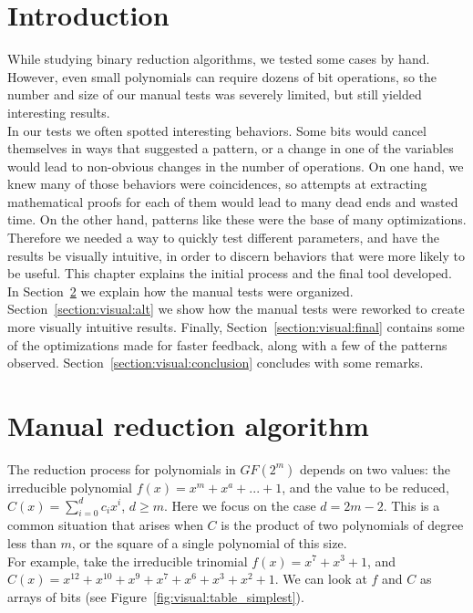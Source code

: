 \section{Introduction}

While studying binary reduction algorithms, we tested some cases by hand. However, even small polynomials can require dozens of bit operations, so the number and size of our manual tests was severely limited, but still yielded interesting results. \\

In our tests we often spotted interesting behaviors. Some bits would cancel themselves in ways that suggested a pattern, or a change in one of the variables would lead to non-obvious changes in the number of operations. On one hand, we knew many of those behaviors were coincidences, so attempts at extracting mathematical proofs for each of them would lead to many dead ends and wasted time. On the other hand, patterns like these were the base of many optimizations. \\

Therefore we needed a way to quickly test different parameters, and have the results be visually intuitive, in order to discern behaviors that were more likely to be useful. This chapter explains the initial process and the final tool developed. In Section~\ref{section:visual:manual} we explain how the manual tests were organized. Section~\ref{section:visual:alt} we show how the manual tests were reworked to create more visually intuitive results. Finally, Section~\ref{section:visual:final} contains some of the optimizations made for faster feedback, along with a few of the patterns observed. Section~\ref{section:visual:conclusion} concludes with some remarks.

\section{Manual reduction algorithm} \label{section:visual:manual}

The reduction process for polynomials in $GF(2^m)$ depends on two values: the irreducible polynomial $f(x) = x^m + x^a + ... + 1$, and the value to be reduced, $C(x) = \sum_{i=0}^{d} c_i x^i$, $d \geq m$. Here we focus on the case $d=2m-2$. This is a common situation that arises when $C$ is the product of two polynomials of degree less than $m$, or the square of a single polynomial of this size. \\

For example, take the irreducible trinomial $f(x) = x^7 + x^3 + 1$, and $C(x) = x^{12} + x^{10} + x^9 + x^7 + x^6 + x^3 + x^2 + 1$. We can look at $f$ and $C$ as arrays of bits (see Figure~\ref{fig:visual:table_simplest}). \\

